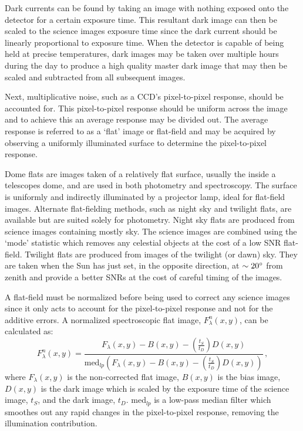 Dark currents can be found by taking an image with nothing exposed onto the detector for a certain exposure time. This resultant dark image can then be scaled to the science images exposure time since the dark current should be linearly proportional to exposure time. When the detector is capable of being held at precise temperatures, dark images may be taken over multiple hours during the day to produce a high quality master dark image that may then be scaled and subtracted from all subsequent images.

Next, multiplicative noise, such as a \gls{CCD}'s pixel-to-pixel response, should be accounted for. This pixel-to-pixel response should be uniform across the image and to achieve this an average response may be divided out. The average response is referred to as a `flat' image or flat-field and may be acquired by observing a uniformly illuminated surface to determine the pixel-to-pixel response.

Dome flats are images taken of a relatively flat surface, usually the inside a telescopes dome, and are used in both photometry and spectroscopy. The surface is uniformly and indirectly illuminated by a projector lamp, ideal for flat-field images. Alternate flat-fielding methods, such as night sky and twilight flats, are available but are suited solely for photometry.
Night sky flats are produced from science images containing mostly sky. The science images are combined using the `mode' statistic which removes any celestial objects at the cost of a low \gls{SNR} flat-field.
Twilight flats are produced from images of the twilight (or dawn) sky. They are taken when the Sun has just set, in the opposite direction, at $\sim 20\hbox{$^\circ$}$ from zenith and provide a better \glspl{SNR} at the cost of careful timing of the images.

A flat-field must be normalized before being used to correct any science images since it only acts to account for the pixel-to-pixel response and not for the additive errors. A  normalized spectroscopic flat image, $F^{n}_{\lambda}(x,y)$, can be calculated as:
\begin{equation}
    F^{n}_{\lambda}(x,y) = \frac{F_{\lambda}(x,y) - B(x,y) - (\frac{t_{S}}{t_{D}})D(x,y)}{\text{med}_{lp}(F_{\lambda}(x,y) - B(x,y) - (\frac{t_{S}}{t_{D}})D(x,y))}\,,\label{eq:norm_flat}
\end{equation}
where $F_{\lambda}(x,y)$ is the non-corrected flat image, $B(x,y)$ is the bias image, $D(x,y)$ is the dark image which is scaled by the exposure time of the science image, $t_{S}$, and the dark image, $t_{D}$. med$_{lp}$ is a low-pass median filter which smoothes out any rapid changes in the pixel-to-pixel response, removing the illumination contribution.


